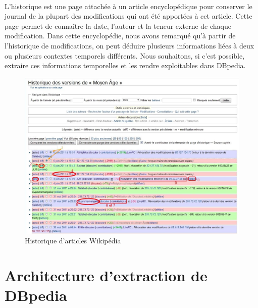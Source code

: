 \paragraph{}
L'historique est une page attachée à un article encyclopédique pour conserver le journal de la plupart des modifications qui ont été apportées à cet article. Cette page permet de connaître la date, l'auteur et la teneur externe de chaque modification.
Dans cette encyclopédie, nous avons remarqué qu'à partir de l'historique de modifications, on peut déduire plusieurs informations liées à deux ou plusieurs contextes temporels différents.
Nous souhaitons, si c’est possible, extraire ces informations temporelles et les rendre exploitables dans DBpedia.
\begin{figure}[H]
\centering
\includegraphics[width=13cm]{Historique_articles.jpg}
\caption{Historique d'articles Wikipédia}
\end{figure}
\newpage

\section{Architecture d'extraction de DBpedia}
